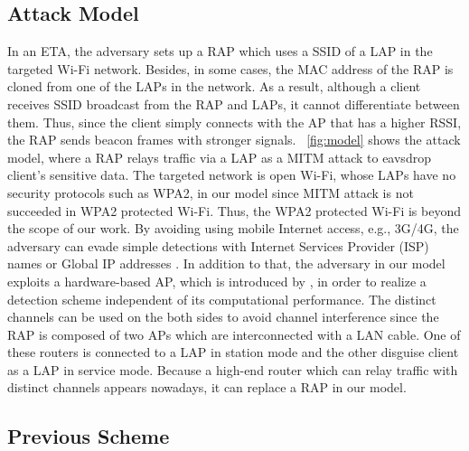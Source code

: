 \documentclass[conference]{IEEEtran}
\begin{document}
\subsection{Attack Model}
In an ETA, the adversary sets up a RAP which uses a SSID of a LAP in the targeted Wi-Fi network.
Besides, in some cases, the MAC address of the RAP is cloned from one of the LAPs in the network\cite{spoof-evi}.
As a result, although a client receives SSID broadcast from the RAP and LAPs, it cannot differentiate between them.
Thus, since the client simply connects with the AP that has a higher RSSI, the RAP sends beacon frames with stronger signals.
\figurename~\ref{fig:model} shows the attack model, where a RAP relays traffic via a LAP as a MITM attack to eavsdrop client's sensitive data.
The targeted network is open Wi-Fi, whose LAPs have no security protocols such as WPA2, in our model since MITM attack is not succeeded in WPA2 protected Wi-Fi\cite{kataoka}.
Thus, the WPA2 protected Wi-Fi is beyond the scope of our work.
By avoiding using mobile Internet access, e.g., 3G/4G, the adversary can evade simple detections with Internet Services Provider (ISP) names or Global IP addresses \cite{rtt}.
In addition to that, the adversary in our model exploits a hardware-based AP, which is introduced by \cite{previous}, in order to realize a detection scheme independent of its computational performance.
The distinct channels can be used on the both sides to avoid channel interference since the RAP is composed of two APs which are interconnected with a LAN cable.
One of these routers is connected to a LAP in station mode and the other disguise client as a LAP in service mode.
Because a high-end router which can relay traffic with distinct channels appears nowadays, it can replace a RAP in our model.

\subsection{Previous Scheme}
\end{document}
